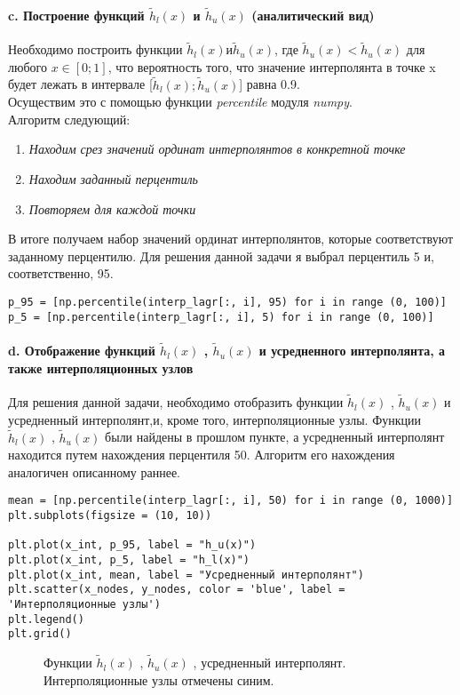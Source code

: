 \paragraph{c. Построение функций  $\tilde{h}_l(x)$ и $\tilde{h}_u(x)$ (аналитический вид) \\ }
\begin{flushleft}
Необходимо построить функции $\tilde{h}_l(x) и \tilde{h}_u(x)$, где $\tilde{h}_u(x) < \tilde{h}_u(x)$ для любого $x\in[0;1]$, что вероятность того, что значение интерполянта в точке x будет лежать в интервале [$\tilde{h}_l(x);\tilde{h}_u(x)$] равна 0.9.
\\
Осуществим это с помощью функции \textit{percentile} модуля \textit{numpy}.\\
Алгоритм следующий: 
\begin{enumerate}
	\item \textit{Находим срез значений ординат интерполянтов в конкретной точке}
	\item \textit{Находим заданный перцентиль}
	\item \textit{Повторяем для каждой точки}
\end{enumerate}
В итоге получаем набор значений ординат интерполянтов, которые соответствуют заданному перцентилю.
Для решения данной задачи я выбрал перцентиль 5 и, соответственно, 95.
\end{flushleft}
\begin{lstlisting} 
p_95 = [np.percentile(interp_lagr[:, i], 95) for i in range (0, 100)]
p_5 = [np.percentile(interp_lagr[:, i], 5) for i in range (0, 100)]
\end{lstlisting} 
\paragraph{d. Отображение функций  $\tilde{h}_l(x)$ , $\tilde{h}_u(x)$ 
 и усредненного интерполянта, а также интерполяционных узлов\\ }
\begin{flushleft}
Для решения данной задачи, необходимо отобразить
функции  $\tilde{h}_l(x)$ , $\tilde{h}_u(x)$ 
и усредненный интерполянт,и, кроме того, интерполяционные узлы.
Функции $\tilde{h}_l(x)$ , $\tilde{h}_u(x)$ были найдены в прошлом пункте, а усредненный интерполянт находится путем нахождения перцентиля 50. Алгоритм его нахождения аналогичен описанному раннее.
\end{flushleft}
\begin{lstlisting}
mean = [np.percentile(interp_lagr[:, i], 50) for i in range (0, 1000)]
plt.subplots(figsize = (10, 10))
 
plt.plot(x_int, p_95, label = "h_u(x)")
plt.plot(x_int, p_5, label = "h_l(x)")
plt.plot(x_int, mean, label = "Усредненный интерполянт")
plt.scatter(x_nodes, y_nodes, color = 'blue', label = 'Интерполяционные узлы')
plt.legend()
plt.grid()
\end{lstlisting}
\clearpage
\begin{figure}[h]
\caption{Функции $\tilde{h}_l(x)$ , $\tilde{h}_u(x)$ 
, усредненный интерполянт. Интерполяционные узлы отмечены синим.}
\end{figure}
